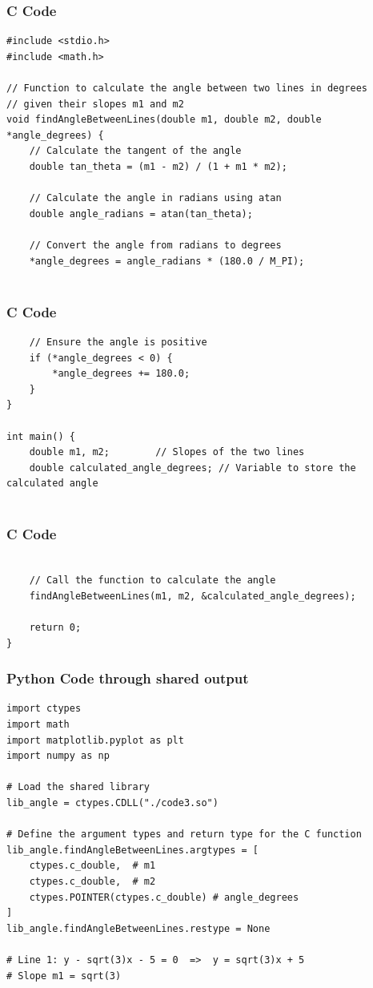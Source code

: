 \documentclass{beamer}
\begin{document}
\begin{frame}[fragile]
\frametitle{C Code}
\begin{lstlisting}
#include <stdio.h>
#include <math.h>

// Function to calculate the angle between two lines in degrees
// given their slopes m1 and m2
void findAngleBetweenLines(double m1, double m2, double *angle_degrees) {
    // Calculate the tangent of the angle
    double tan_theta = (m1 - m2) / (1 + m1 * m2);

    // Calculate the angle in radians using atan
    double angle_radians = atan(tan_theta);

    // Convert the angle from radians to degrees
    *angle_degrees = angle_radians * (180.0 / M_PI);
    
\end{lstlisting}
\end{frame}
\begin{frame}[fragile]
\frametitle{C Code }
\begin{lstlisting}
    // Ensure the angle is positive
    if (*angle_degrees < 0) {
        *angle_degrees += 180.0;
    }
}

int main() {
    double m1, m2;        // Slopes of the two lines
    double calculated_angle_degrees; // Variable to store the calculated angle


    \end{lstlisting}
\end{frame}
\begin{frame}[fragile]
\frametitle{C Code }
\begin{lstlisting}
   
    // Call the function to calculate the angle
    findAngleBetweenLines(m1, m2, &calculated_angle_degrees);
    
    return 0;
}
\end{lstlisting}
\end{frame}

\begin{frame}[fragile]
\frametitle{Python Code through shared output }

\begin{lstlisting}
import ctypes
import math
import matplotlib.pyplot as plt
import numpy as np

# Load the shared library
lib_angle = ctypes.CDLL("./code3.so") 

# Define the argument types and return type for the C function
lib_angle.findAngleBetweenLines.argtypes = [
    ctypes.c_double,  # m1
    ctypes.c_double,  # m2
    ctypes.POINTER(ctypes.c_double) # angle_degrees
]
lib_angle.findAngleBetweenLines.restype = None

# Line 1: y - sqrt(3)x - 5 = 0  =>  y = sqrt(3)x + 5
# Slope m1 = sqrt(3)
\end{lstlisting}
\end{frame}
\end{document}
